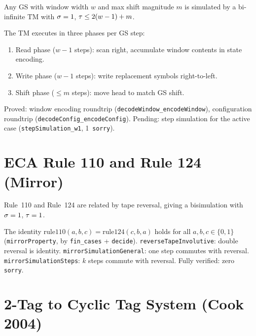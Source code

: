 \begin{proposition}[GS $\to$ TM]\label{prop:gs-tm}
\notready
{}
Any GS with window width $w$ and max shift magnitude $m$ is simulated by a
bi-infinite TM with $\sigma = 1$, $\tau \leq 2(w-1) + m$.

The TM executes in three phases per GS step:
\begin{enumerate}
\item Read phase ($w-1$ steps): scan right, accumulate window contents in
  state encoding.
\item Write phase ($w-1$ steps): write replacement symbols right-to-left.
\item Shift phase ($\leq m$ steps): move head to match GS shift.
\end{enumerate}

Proved: window encoding roundtrip (\texttt{decodeWindow\_encodeWindow}),
configuration roundtrip (\texttt{decodeConfig\_encodeConfig}).
Pending: step simulation for the active case (\texttt{stepSimulation\_w1},
1~\texttt{sorry}).
\end{proposition}

\section{ECA Rule 110 and Rule 124 (Mirror)}

\begin{proposition}\label{mirror-sim}
\leanok
{}
Rule~110 and Rule~124 are related by tape reversal, giving a bisimulation with
$\sigma = 1$, $\tau = 1$.

The identity $\mathrm{rule110}(a,b,c) = \mathrm{rule124}(c,b,a)$ holds for all
$a,b,c \in \{0,1\}$ (\texttt{mirrorProperty}, by \texttt{fin\_cases} +
\texttt{decide}).
\texttt{reverseTapeInvolutive}: double reversal is identity.
\texttt{mirrorSimulationGeneral}: one step commutes with reversal.
\texttt{mirrorSimulationSteps}: $k$ steps commute with reversal.
Fully verified: zero \texttt{sorry}.
\end{proposition}

\section{2-Tag to Cyclic Tag System (Cook 2004)}

